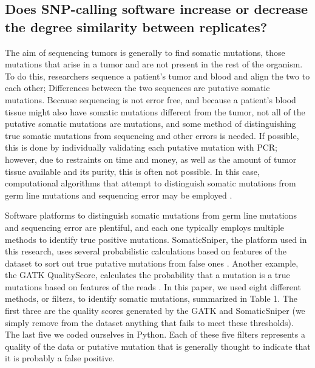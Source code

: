 \documentclass[11pt]{article} %
\begin{document}
\subsection*{Does SNP-calling software increase or decrease the degree similarity between replicates?}

The aim of sequencing tumors is generally to find somatic mutations, those mutations that arise in a tumor and are not present in the rest of the organism. To do this, researchers sequence a patient's tumor and blood and align the two to each other; Differences between the two sequences are putative somatic mutations. Because sequencing is not error free, and because a patient's blood tissue might also have somatic mutations different from the tumor, not all of the putative somatic mutations are mutations, and some method of distinguishing true somatic mutations from sequencing and other errors is needed. If possible, this is done by individually validating each putative mutation with PCR; however, due to restraints on time and money, as well as the amount of tumor tissue available and its purity, this is often not possible. In this case, computational algorithms that attempt to distinguish somatic mutations from germ line mutations and sequencing error may be employed \citep{SomaticSniper, mut_calling}. 

Software platforms to distinguish somatic mutations from germ line mutations and sequencing error are plentiful, and each one typically employs multiple methods to identify true positive mutations. SomaticSniper, the platform used in this research, uses several probabilistic calculations based on features of the dataset to sort out true putative mutations from false ones \citep{SomaticSniper}. Another example, the GATK QualityScore, calculates the probability that a mutation is a true mutations based on features of the reads \cite{GATK}. In this paper, we used eight different methods, or filters, to identify somatic mutations, summarized in Table 1. The first three are the quality scores generated by the GATK and SomaticSniper (we simply remove from the dataset anything that fails to meet these thresholds). The last five we coded ourselves in Python. Each of these five filters represents a quality of the data or putative mutation that is generally thought to indicate that it is probably a false positive.
\end{document}
